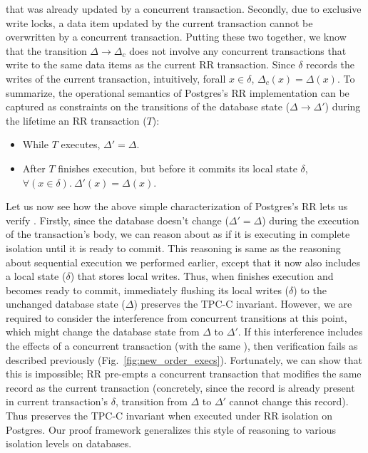 that was already updated by a concurrent transaction. Secondly, due to
exclusive write locks, a data item updated by the current transaction
cannot be overwritten by a concurrent transaction. Putting these two
together, we know that the transition $\Delta \longrightarrow
\Delta_c$ does not involve any concurrent transactions that write to
the same data items as the current RR transaction. Since $\delta$
records the writes of the current transaction, intuitively, forall
$x\in\delta$, $\Delta_c(x) = \Delta(x)$. To summarize, the operational
semantics of Postgres's RR implementation can be captured as
constraints on the transitions of the database state ($\Delta
\longrightarrow \Delta'$) during the lifetime an RR
transaction ($T$):
\begin{itemize}
  \item While $T$ executes, $\Delta' = \Delta$.
  \item After $T$ finishes execution, but before it commits its local
    state $\delta$, $\forall(x\in\delta).~\Delta'(x) = \Delta(x)$.
\end{itemize}

Let us now see how the above simple characterization of Postgres's RR
lets us verify . Firstly, since the database doesn't
change ($\Delta' = \Delta$) during the execution of the transaction's
body, we can reason about  as if it is executing in
complete isolation until it is ready to commit. This reasoning is same
as the reasoning about sequential execution we performed earlier,
except that it now also includes a local state ($\delta$) that stores
local writes. Thus, when  finishes execution and becomes
ready to commit, immediately flushing its local writes ($\delta$) to
the unchanged database state ($\Delta$) preserves the TPC-C invariant.
However, we are required to consider the  interference from concurrent
transitions at this point, which might change the database state from
$\Delta$ to $\Delta'$. If this interference includes the effects of a
concurrent  transaction (with the same ), then
verification fails as described previously
(Fig.~\ref{fig:new_order_execs}). Fortunately, we can show that this
is impossible; RR pre-empts a concurrent  transaction
that modifies the same  record as the current transaction
(concretely, since the record is already present in current
transaction's $\delta$, transition from $\Delta$ to $\Delta'$ cannot
change this record). Thus  preserves the TPC-C
invariant when executed under RR isolation on Postgres. Our proof
framework generalizes this style of reasoning to various isolation
levels on databases.


